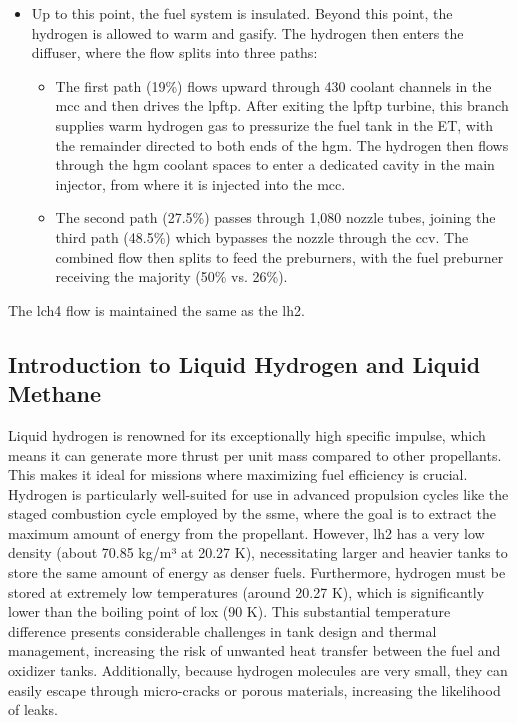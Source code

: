 \begin{itemize}
    \item Up to this point, the fuel system is insulated. Beyond this point, the hydrogen is allowed to warm and gasify. The hydrogen then enters the diffuser, where the flow splits into three paths:
        \begin{itemize}
            \item The first path (19\%) flows upward through 430 coolant channels in the \acrshort{mcc} and then drives the \acrshort{lpftp}. After exiting the \acrshort{lpftp} turbine, this branch supplies warm hydrogen gas to pressurize the fuel tank in the ET, with the remainder directed to both ends of the \acrfull{hgm}. The hydrogen then flows through the \acrshort{hgm} coolant spaces to enter a dedicated cavity in the main injector, from where it is injected into the \acrshort{mcc}.
            \item The second path (27.5\%) passes through 1,080 nozzle tubes, joining the third path (48.5\%) which bypasses the nozzle through the \acrfull{ccv}. The combined flow then splits to feed the preburners, with the fuel preburner receiving the majority (50\% vs. 26\%).
        \end{itemize}
\end{itemize}
The \acrlong{lch4} flow is maintained the same as the \acrlong{lh2}.

\subsection{Introduction to Liquid Hydrogen and Liquid Methane}
Liquid hydrogen is renowned for its exceptionally high specific impulse, which means it can generate more thrust per unit mass compared to other propellants.
This makes it ideal for missions where maximizing fuel efficiency is crucial. 
Hydrogen is particularly well-suited for use in advanced propulsion cycles like the staged combustion cycle employed by the \acrshort{ssme}, where the goal is to extract the maximum amount of energy from the propellant.
However, \acrlong{lh2} has a very low density (about 70.85 kg/m³ at 20.27 K), necessitating larger and heavier tanks to store the same amount of energy as denser fuels.
Furthermore, hydrogen must be stored at extremely low temperatures (around 20.27 K), which is significantly lower than the boiling point of \acrlong{lox} (90 K).
This substantial temperature difference presents considerable challenges in tank design and thermal management, increasing the risk of unwanted heat transfer between the fuel and oxidizer tanks.
Additionally, because hydrogen molecules are very small, they can easily escape through micro-cracks or porous materials, increasing the likelihood of leaks.


